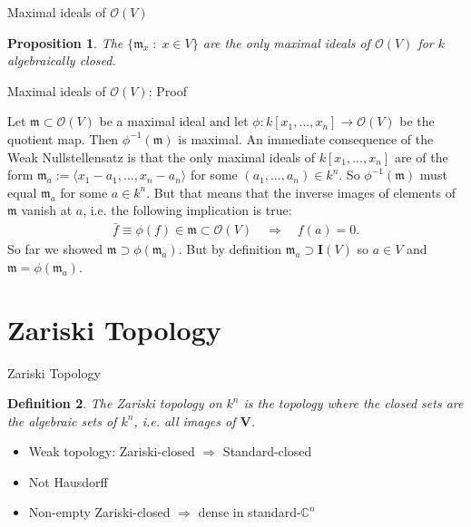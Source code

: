 \documentclass[notes=hide]{beamer}
\newtheorem{defn}{Definition}
\newtheorem{prop}[defn]{Proposition}
\newcommand{\C}{\mathbb{C}}
\newcommand{\V}{\mathbf{V}}
\newcommand{\I}{\mathbf{I}}
\newcommand{\mvar}[2]{#1_1,\ldots , #1_{#2}}
\newcommand{\kxn}{k[\mvar{x}{n}]}
\begin{document}
\begin{frame}{Maximal ideals of $\mathcal{O}(V)$}
\begin{prop}
The $\{ \mathfrak{m}_x \; : \;  x \in V \}$ are the only maximal ideals of $\mathcal{O}(V)$ for $k$ algebraically closed.
\end{prop}

\end{frame}
\begin{frame}{Maximal ideals of $\mathcal{O}(V)$: Proof}

Let $\mathfrak{m} \subset \mathcal{O}(V)$ be a maximal ideal and let $\phi : \kxn \rightarrow \mathcal{O}(V)$ be the quotient map. Then $\phi^{-1} (\mathfrak{m})$ is maximal. \pause An immediate consequence of the Weak Nullstellensatz is that the only maximal ideals of $\kxn$ are of the form $\mathfrak{m}_a := \langle x_1-a_1 ,\ldots , x_n-a_n \rangle$ for some $(\mvar{a}{n}) \in k^n$. \pause So $\phi^{-1}(\mathfrak{m})$ must equal $\mathfrak{m}_a$ for some $a\in k^n$. \pause
But that means that the inverse images of elements of $\mathfrak{m}$ vanish at $a$, i.e. the following implication is true:
\begin{align*}
 \bar{f} \equiv \phi (f) \in \mathfrak{m} \subset \mathcal{O}(V) \quad \Rightarrow \quad f(a) =0  .
\end{align*} \pause
So far we showed $\mathfrak{m} \supset \phi (\mathfrak{m}_a)$.  \pause But by definition $\mathfrak{m}_a \supset \I (V)$ so $a \in V$ and $\mathfrak{m} = \phi (\mathfrak{m}_a)$.

\end{frame}


\section{Zariski Topology}

\begin{frame}{Zariski Topology}
\begin{defn}
The \emph{Zariski topology} on $k^n$ is the topology where the closed sets are the algebraic sets of $k^n$, i.e. all images of $\V$.
\end{defn} \pause
\begin{itemize}[<+->]
\item Weak topology: Zariski-closed $\Rightarrow$ Standard-closed
\item Not Hausdorff
\item Non-empty Zariski-closed $\Rightarrow$ dense in standard-$\C^n$
\end{itemize}
\end{frame}
\end{document}
